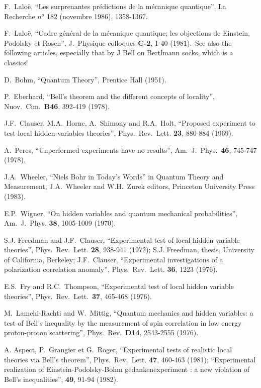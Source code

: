 \documentclass[12pt,onecolumn]{article}%
\begin{document}
\begin{thebibliography}{999}
F.\ Lalo\"{e}, ``Les surprenantes pr\'{e}dictions de la
m\'{e}canique quantique'', La Recherche $n^{o}$ 182 (novembre 1986), 1358-1367.

F.\ Lalo\"{e}, ``Cadre g\'{e}n\'{e}ral de la m\'{e}canique
quantique; les objections de Einstein, Podolsky et Rosen'', J.\ Physique
colloques \textbf{C-2}, 1-40 (1981).\ See also the following articles,
especially that by J Bell on Bertlmann socks, which is a classics!

D.\ Bohm, ``Quantum Theory'', Prentice Hall (1951).

P.\ Eberhard, ``Bell's theorem and the different concepts
of locality'', Nuov.\ Cim.\ \textbf{B46}, 392-419 (1978).

J.F.\ Clauser, M.A.\ Horne, A.\ Shimony and R.A.\ Holt,
``Proposed experiment to test local hidden-variables theories'',
Phys.\ Rev.\ Lett. \textbf{23}, 880-884 (1969).

A.\ Peres, ``Unperformed experiments have no results'',
Am.\ J.\ Phys.\ \textbf{46}, 745-747 (1978).

J.A.\ Wheeler, ``Niels Bohr in Today's Words'' in Quantum
Theory and Measurement, J.A.\ Wheeler and W.H.\ Zurek editors, Princeton
University Press (1983).

E.P.\ Wigner, ``On hidden variables and quantum
mechanical probabilities'', Am.\ J.\ Phys. \textbf{38}, 1005-1009 (1970).

S.J. Freedman and J.F.\ Clauser, ``Experimental test of
local hidden variable theories'', Phys.\ Rev.\ Lett. \textbf{28}, 938-941
(1972); S.J. Freedman, thesis, University of California, Berkeley;
J.F.\ Clauser, ``Experimental investigations of a polarization correlation
anomaly'', Phys.\ Rev.\ Lett. \textbf{36}, 1223 (1976).

E.S.\ Fry and R.C.\ Thompson, ``Experimental test of local
hidden variable theories'', Phys.\ Rev.\ Lett.\ \textbf{37}, 465-468 (1976).

M.\ Lamehi-Rachti and W.\ Mittig, ``Quantum mechanics and
hidden variables: a test of Bell's inequality by the measurement of spin
correlation in low energy proton-proton scattering'',
Phys.\ Rev.\ \textbf{D14}, 2543-2555 (1976).

A. Aspect, P.\ Grangier et G.\ Roger, ``Experimental tests of
realistic local theories via Bell's theorem'', Phys.\ Rev.\ Lett. \textbf{47},
460-463 (1981); ``Experimental realization of Einstein-Podolsky-Bohm
gedankenexperiment : a new violation of Bell's inequalities'', \textbf{49},
91-94 (1982).


\end{thebibliography}
\end{document}
